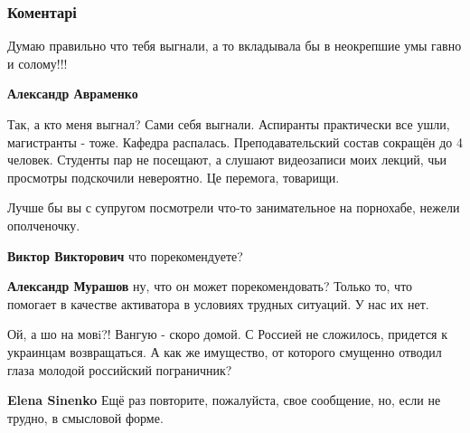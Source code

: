  
 
 
 
 
\subsubsection{Коментарі}

\begin{itemize} %
Думаю правильно что тебя выгнали, а то вкладывала бы в неокрепшие умы гавно и солому!!!

\begin{itemize} %

\textbf{Александр Авраменко} 

Так, а кто меня выгнал? Сами себя выгнали. Аспиранты
практически все ушли, магистранты - тоже. Кафедра распалась.
Преподавательский состав сокращён до 4 человек. Студенты пар не
посещают, а слушают видеозаписи моих лекций, чьи просмотры
подскочили невероятно. Це перемога, товарищи.

\end{itemize} %

Лучше бы вы с супругом посмотрели что-то занимательное на порнохабе, нежели ополченочку.

\begin{itemize} %
\textbf{Виктор Викторович} что порекомендуете?


\textbf{Александр Мурашов} ну, что он может порекомендовать? Только то, что помогает в качестве активатора в условиях трудных ситуаций. У нас их нет.
\end{itemize} %


Ой, а шо на мовi?! Вангую - скоро домой. С Россией не сложилось, придется к
украинцам возвращаться. А как же имущество, от которого смущенно отводил глаза
молодой российский пограничник?

\begin{itemize} %
\textbf{Elena Sinenko} Ещё раз повторите, пожалуйста, свое сообщение, но, если не трудно, в смысловой форме.


\end{itemize}
\end{itemize}
